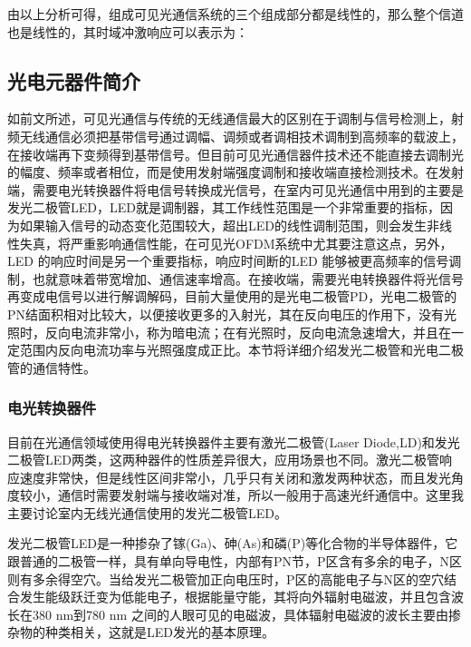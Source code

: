 由以上分析可得，组成可见光通信系统的三个组成部分都是线性的，那么整个信道也是线性的，其时域冲激响应可以表示为：




\subsection{光电元器件简介}
如前文所述，可见光通信与传统的无线通信最大的区别在于调制与信号检测上，射频无线通信必须把基带信号通过调幅、调频或者调相技术调制到高频率的载波上，在接收端再下变频得到基带信号。但目前可见光通信器件技术还不能直接去调制光的幅度、频率或者相位，而是使用发射端强度调制和接收端直接检测技术。在发射端，需要电光转换器件将电信号转换成光信号，在室内可见光通信中用到的主要是发光二极管LED，LED就是调制器，其工作线性范围是一个非常重要的指标，因为如果输入信号的动态变化范围较大，超出LED的线性调制范围，则会发生非线性失真，将严重影响通信性能，在可见光OFDM系统中尤其要注意这点，另外，LED 的响应时间是另一个重要指标，响应时间断的LED 能够被更高频率的信号调制，也就意味着带宽增加、通信速率增高。在接收端，需要光电转换器件将光信号再变成电信号以进行解调解码，目前大量使用的是光电二极管PD，光电二极管的PN结面积相对比较大，以便接收更多的入射光，其在反向电压的作用下，没有光照时，反向电流非常小，称为暗电流；在有光照时，反向电流急速增大，并且在一定范围内反向电流功率与光照强度成正比。本节将详细介绍发光二极管和光电二极管的通信特性。
\subsubsection{电光转换器件}
目前在光通信领域使用得电光转换器件主要有激光二极管(Laser Diode,LD)和发光二极管LED两类，这两种器件的性质差异很大，应用场景也不同。激光二极管响应速度非常快，但是线性区间非常小，几乎只有关闭和激发两种状态，而且发光角度较小，通信时需要发射端与接收端对准，所以一般用于高速光纤通信中。这里我主要讨论室内无线光通信使用的发光二极管LED。

发光二极管LED是一种掺杂了镓(Ga)、砷(As)和磷(P)等化合物的半导体器件，它跟普通的二极管一样，具有单向导电性，内部有PN节，P区含有多余的电子，N区则有多余得空穴。当给发光二极管加正向电压时，P区的高能电子与N区的空穴结合发生能级跃迁变为低能电子，根据能量守能，其将向外辐射电磁波，并且包含波长在380 nm到780 nm 之间的人眼可见的电磁波，具体辐射电磁波的波长主要由掺杂物的种类相关，这就是LED发光的基本原理。


